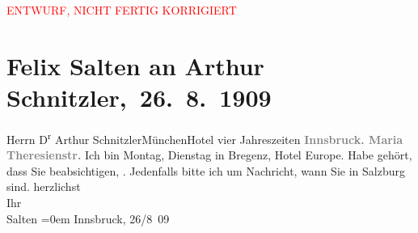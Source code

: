 
\begin{center}
            \textcolor{red}{ENTWURF, NICHT FERTIG KORRIGIERT}
                      \end{center}
            
         
         \renewcommand{\erwaehntePersonen}{Personen: Felix Salten}
         \renewcommand{\erwaehnteOrte}{Orte: Bregenz, Hotel Vier Jahreszeiten, Hotel de l’Europe, Innsbruck, Maria-Theresien-Straße, München, Salzburg}
         \renewcommand{\erwaehnteWerke}{}
               \section[ Felix Salten an Arthur Schnitzler, 26. 8. 1909]{ Felix Salten an Arthur Schnitzler, 26. 8. 1909}\nopagebreak{}\rehead{ }\begin{ledgroupsized}[t]{13cm}\normalsize\beginnumbering \toendnotes[C]{\smallbreak\pagebreak[2]} 
\toendnotes[C]{\smallbreak}\pstart{}{\pb}Herrn D\textsuperscript{r} Arthur Schnitzler\pend{}\pstart{}München\pend{}\pstart{}Hotel vier Jahreszeiten\pend{}{\bigskip}\pstart
           \noindent{}\centering{}{\pb}\textcolor{gray}{\textbf{Innsbruck. Maria Theresienstr.}}\pend
           \pstart
           {\pb}Ich bin Montag, Dienstag in Bregenz, Hotel Europe.
               Habe gehört, dass Sie beabsichtigen, \label{K_L03507-1v}\label{K_L03507-1h}. Jedenfalls bitte ich um Nachricht, wann Sie in Salzburg sind.\pend
           \pstart
           herzlichst {\\[\baselineskip]}Ihr {\\[\baselineskip]}\spacefill\mbox{Salten}\pend
           \leftskip=0em{}\pstart
           Innsbruck, 26/8 09\pend
           
         
         \endnumbering{}\end{ledgroupsized}  \newcommand{\dateiname}{L03507}\newcommand{\titel}{Felix Salten an Arthur Schnitzler, 26. 8. 1909}\newcommand{\editorInnen}{Martin Anton Müller und Laura Untner}
      